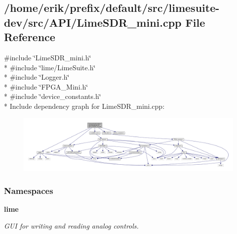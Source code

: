 \subsection{/home/erik/prefix/default/src/limesuite-\/dev/src/\+A\+P\+I/\+Lime\+S\+D\+R\+\_\+mini.cpp File Reference}
\label{LimeSDR__mini_8cpp}
{\ttfamily \#include \char`\"{}Lime\+S\+D\+R\+\_\+mini.\+h\char`\"{}}\\*
{\ttfamily \#include \char`\"{}lime/\+Lime\+Suite.\+h\char`\"{}}\\*
{\ttfamily \#include \char`\"{}Logger.\+h\char`\"{}}\\*
{\ttfamily \#include \char`\"{}F\+P\+G\+A\+\_\+\+Mini.\+h\char`\"{}}\\*
{\ttfamily \#include \char`\"{}device\+\_\+constants.\+h\char`\"{}}\\*
Include dependency graph for Lime\+S\+D\+R\+\_\+mini.\+cpp\+:
\nopagebreak
\begin{figure}[H]
\begin{center}
\leavevmode
\includegraphics[width=350pt]{da/dfe/LimeSDR__mini_8cpp__incl}
\end{center}
\end{figure}
\subsubsection*{Namespaces}
\begin{DoxyCompactItemize}
\item 
 {\bf lime}
\begin{DoxyCompactList}\small\item\em G\+UI for writing and reading analog controls. \end{DoxyCompactList}\end{DoxyCompactItemize}
